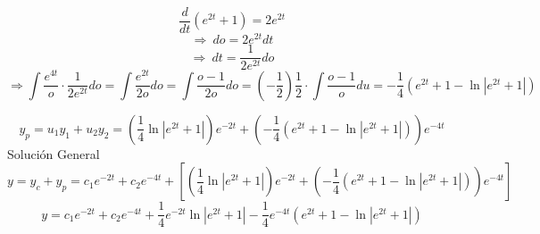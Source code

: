 $$\frac{d}{dt}\left(e^{2t}+1\right)=2e^{2t}$$
$$\Rightarrow \:do=2e^{2t}dt$$
$$\Rightarrow \:dt=\frac{1}{2e^{2t}}do$$
$$ \Rightarrow \int \frac{e^{4t}}{o}\cdot \frac{1}{2e^{2t}}do  =\int \frac{e^{2t}}{2o}do=\int \frac{o-1}{2o}do=\left(-\frac{1}{2}\right)\frac{1}{2}\cdot \int \frac{o-1}{o}du=-\frac{1}{4}\left(e^{2t}+1-\ln \left|e^{2t}+1\right|\right)$$

$$y_p=u_1y_1+u_2y_2=(\frac{1}{4}\ln \left|e^{2t}+1\right|)e^{-2t}+(-\frac{1}{4}\left(e^{2t}+1-\ln \left|e^{2t}+1\right|\right))e^{-4t}$$
Solución General
$$y=y_c+y_p=c_1e^{-2t}+c_2e^{-4t}+\left[(\frac{1}{4}\ln \left|e^{2t}+1\right|)e^{-2t}+(-\frac{1}{4}\left(e^{2t}+1-\ln \left|e^{2t}+1\right|\right))e^{-4t}\right] $$
$$y=c_1e^{-2t}+c_2e^{-4t}+\frac{1}{4}e^{-2t}\ln \left|e^{2t}+1\right|-\frac{1}{4}e^{-4t}\left(e^{2t}+1-\ln \left|e^{2t}+1\right|\right)$$